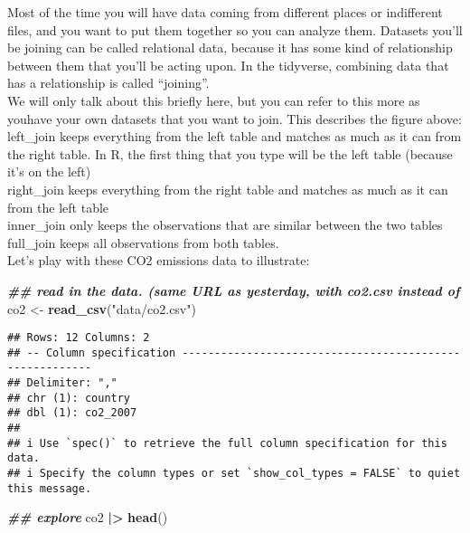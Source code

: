 \documentclass[
]{article}
\newenvironment{Shaded}{\begin{snugshade}}{\end{snugshade}}
\newcommand{\DocumentationTok}[1]{\textcolor[rgb]{0.56,0.35,0.01}{\textbf{\textit{#1}}}}
\newcommand{\FunctionTok}[1]{\textcolor[rgb]{0.13,0.29,0.53}{\textbf{#1}}}
\newcommand{\NormalTok}[1]{#1}
\newcommand{\OtherTok}[1]{\textcolor[rgb]{0.56,0.35,0.01}{#1}}
\newcommand{\SpecialCharTok}[1]{\textcolor[rgb]{0.81,0.36,0.00}{\textbf{#1}}}
\newcommand{\StringTok}[1]{\textcolor[rgb]{0.31,0.60,0.02}{#1}}
\begin{document}
Most of the time you will have data coming from different places or
indifferent files, and you want to put them together so you can analyze
them. Datasets you'll be joining can be called relational data, because
it has some kind of relationship between them that you'll be acting
upon. In the tidyverse, combining data that has a relationship is called
``joining''.\\
We will only talk about this briefly here, but you can refer to this
more as youhave your own datasets that you want to join. This describes
the figure above:\\
left\_join keeps everything from the left table and matches as much as
it can from the right table. In R, the first thing that you type will be
the left table (because it's on the left)\\
right\_join keeps everything from the right table and matches as much as
it can from the left table\\
inner\_join only keeps the observations that are similar between the two
tables\\
full\_join keeps all observations from both tables.\\
Let's play with these CO2 emissions data to illustrate:\\

\begin{Shaded}
\begin{Highlighting}[]
\DocumentationTok{\#\# read in the data. (same URL as yesterday, with co2.csv instead of}
\NormalTok{co2 }\OtherTok{\textless{}{-}} \FunctionTok{read\_csv}\NormalTok{(}\StringTok{"data/co2.csv"}\NormalTok{)}
\end{Highlighting}
\end{Shaded}

\begin{verbatim}
## Rows: 12 Columns: 2
## -- Column specification --------------------------------------------------------
## Delimiter: ","
## chr (1): country
## dbl (1): co2_2007
## 
## i Use `spec()` to retrieve the full column specification for this data.
## i Specify the column types or set `show_col_types = FALSE` to quiet this message.
\end{verbatim}

\begin{Shaded}
\begin{Highlighting}[]
\DocumentationTok{\#\# explore}
\NormalTok{co2 }\SpecialCharTok{|\textgreater{}} \FunctionTok{head}\NormalTok{()}
\end{Highlighting}
\end{Shaded}
\end{document}
